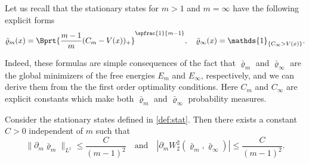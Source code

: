 Let us recall that the stationary states for $m>1$ and $m=\infty$ have the following explicit forms
\begin{equation}\label{def:stat}
\bar\varrho_m(x) = \Bprt{\frac{m-1}{m}(C_m - V(x))_+}^{\spfrac{1}{m-1}}, \quad \bar\varrho_\infty(x)=\mathds{1}_{\{C_\infty > V(x)\}}.
\end{equation}
{Indeed, these formulas are simple consequences of the fact that $\bar\varrho_m$ and $\bar\varrho_{\infty}$ are the global minimizers of the free energies $E_{m}$ and $E_{\infty}$, respectively, and we can derive them from the the first order optimality conditions. Here $C_{m}$ and $C_{\infty}$ are explicit constants which make both $\bar\varrho_m$ and $\bar\varrho_\infty$ probability measures.
\begin{lemma}\label{lem:sec5}
Consider the stationary states defined in \eqref{def:stat}. Then there exists a constant $C>0$ independent of $m$ such that
\[
\|\partial_m \bar\varrho_m\|_{L^1} \leq \frac{C}{(m-1)^2}\quad\text{and}\quad \left| \partial_m W_2^2(\bar\varrho_m, \bar\varrho_\infty)\right| \leq \frac{C}{(m-1)^2}.
\]
\end{lemma}
}


